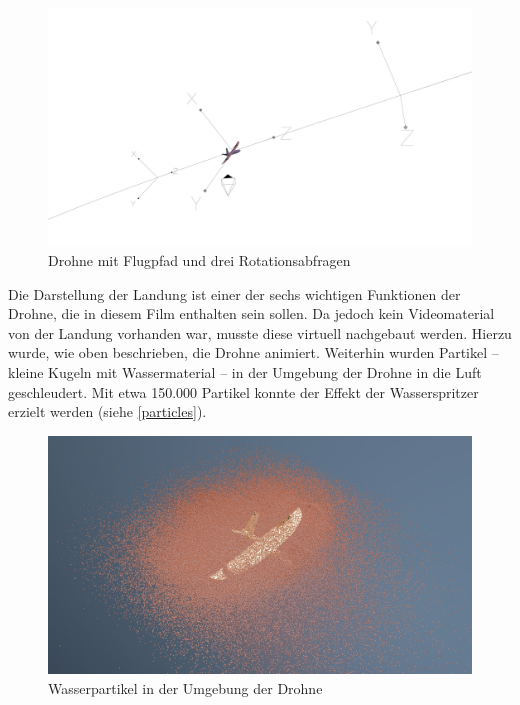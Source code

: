 \begin{figure}[H]
\begin{center}
\includegraphics[width=\textwidth]{gfx/prod/plane/an_flight.jpg}
\caption{Drohne mit Flugpfad und drei Rotationsabfragen}
\label{an_flight}
\end{center}
\end{figure}

Die Darstellung der Landung ist einer der sechs wichtigen Funktionen der Drohne, die in diesem Film enthalten sein sollen.
Da jedoch kein Videomaterial von der Landung vorhanden war, musste diese virtuell nachgebaut werden. Hierzu wurde, wie oben beschrieben, die Drohne animiert. Weiterhin wurden Partikel -- kleine Kugeln mit Wassermaterial -- in der Umgebung der Drohne in die Luft geschleudert. Mit etwa 150.000 Partikel konnte der Effekt der Wasserspritzer erzielt werden (siehe \autoref{particles}).

\begin{figure}[H]
\begin{center}
\includegraphics[width=\textwidth]{gfx/prod/plane/particles.jpg}
\caption{Wasserpartikel in der Umgebung der Drohne}
\label{particles}
\end{center}
\end{figure}


